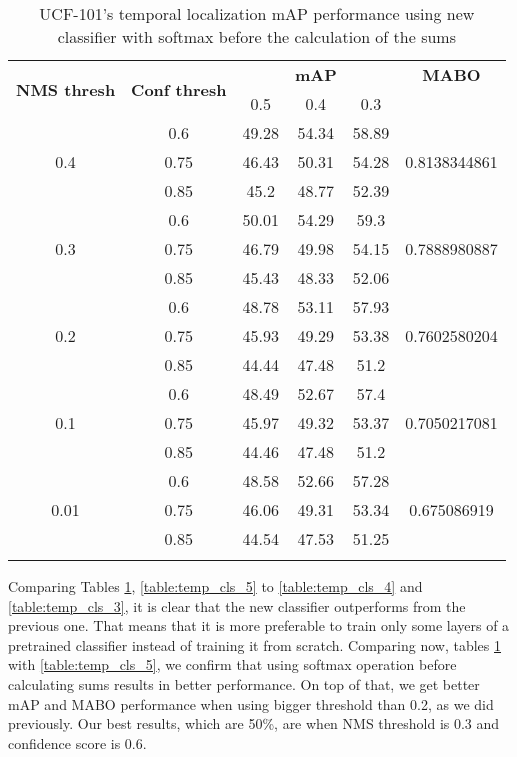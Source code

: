 \begin{center}
\setlength{\tabcolsep}{2pt}
  \begin{longtable}{|| c | c || c c c | c ||}

    \hline
     \multirow{2}{*}{\textbf{NMS thresh}} & \multirow{2}{*}{\textbf{Conf thresh}} & {} & \textbf{mAP} & {} & \textbf{MABO} \\
     {} & {} & 0.5 & 0.4 & 0.3 & {}\\
    \hline
    \multirow{3}{*}{0.4} & 0.6 & 49.28 & 54.34 & 58.89 & \multirow{3}{*}{0.8138344861}\\
    \cline{2-5}
    {} & 0.75 & 46.43 & 50.31 & 54.28 & {}\\
    \cline{2-5}
    {} & 0.85 & 45.2 & 48.77 & 52.39 & {}\\
    \hline
    \multirow{3}{*}{0.3} & 0.6 & 50.01 & 54.29 & 59.3  & \multirow{3}{*}{0.7888980887}\\
    \cline{2-5}
    {} & 0.75 & 46.79 & 49.98 & 54.15 & {}\\
    \cline{2-5}
    {} & 0.85 & 45.43 & 48.33 & 52.06 & {}\\
    \hline
    \multirow{3}{*}{0.2} & 0.6 & 48.78& 53.11 & 57.93 & \multirow{3}{*}{0.7602580204}\\
    \cline{2-5}
    {} & 0.75 & 45.93 & 49.29 & 53.38 & {}\\
    \cline{2-5}
    {} & 0.85 & 44.44 & 47.48 & 51.2  & {}\\
    \hline
    \multirow{3}{*}{0.1} & 0.6 & 48.49 & 52.67 & 57.4 & \multirow{3}{*}{0.7050217081}\\
    \cline{2-5}
    {} & 0.75 & 45.97 & 49.32 & 53.37 & {} \\
    \cline{2-5}
    {} & 0.85 & 44.46 & 47.48 & 51.2 & {}\\
    \hline
    \multirow{3}{*}{0.01} & 0.6 & 48.58 & 52.66 & 57.28  & \multirow{3}{*}{0.675086919}\\
    \cline{2-5}
    {} & 0.75 & 46.06 & 49.31 & 53.34 & {} \\
    \cline{2-5}
    {} & 0.85 & 44.54 & 47.53 & 51.25 & {}\\
    \hline

    \caption{UCF-101's temporal localization mAP performance using new classifier with softmax before the calculation of the sums}
    \label{table:temp_cls_6}
  \end{longtable}
\end{center}

Comparing Tables \ref{table:temp_cls_6}, \ref{table:temp_cls_5} to \ref{table:temp_cls_4} and \ref{table:temp_cls_3}, it is clear that the new classifier outperforms from the previous one.
That means that it is more preferable to train only some layers of a pretrained classifier instead of training it from scratch. Comparing now, tables \ref{table:temp_cls_6} with
\ref{table:temp_cls_5}, we confirm that using softmax operation before calculating sums results in better performance. On top of that, we get better mAP and MABO performance when
using bigger threshold than 0.2, as we did previously. Our best results, which are 50\%, are when NMS threshold is 0.3 and confidence score is 0.6.

% 
